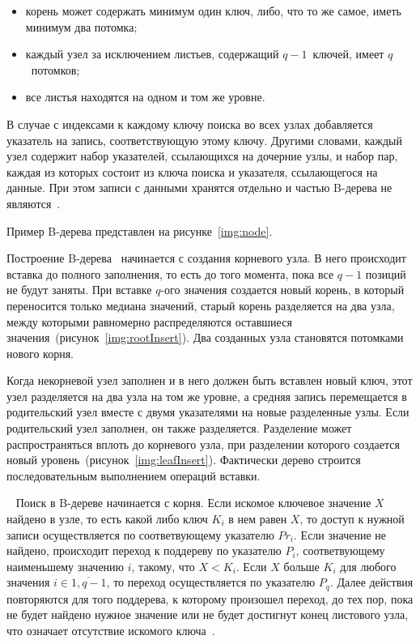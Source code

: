 \begin{itemize}
    \item корень может содержать минимум один ключ, либо, что то же самое, иметь
        минимум два потомка;

    \item каждый узел за исключением листьев, содержащий $q-1$~ключей, имеет
        $q$~потомков;

    \item все листья находятся на одном и том же уровне.
\end{itemize}

В случае с индексами к каждому ключу поиска во всех узлах добавляется указатель
на запись, соответствующую этому ключу. Другими словами, каждый узел содержит
набор указателей, ссылающихся на дочерние узлы, и набор пар, каждая из которых
состоит из ключа поиска и указателя, ссылающегося на данные. При этом записи с
данными хранятся отдельно и частью B-дерева не являются~\cite{arki}.

Пример B-дерева представлен на рисунке~\ref{img:node}.
~\\


Построение B-дерева~\cite{flatfish} начинается с создания корневого узла. В него
происходит вставка до полного заполнения, то есть до того момента, пока все
$q-1$ позиций не будут заняты. При вставке $q$-ого значения создается новый
корень, в который переносится только медиана значений, старый корень разделяется
на два узла, между которыми равномерно распределяются оставшиеся
значения~(рисунок~\ref{img:rootInsert}). Два созданных узла становятся потомками
нового корня.


Когда некорневой узел заполнен и в него должен быть вставлен новый ключ, этот
узел разделяется на два узла на том же уровне, а средняя запись перемещается в
родительский узел вместе с двумя указателями на новые разделенные узлы. Если
родительский узел заполнен, он также разделяется. Разделение может
распространяться вплоть до корневого узла, при разделении которого создается
новый уровень~(рисунок~\ref{img:leafInsert}). Фактически дерево строится
последовательным выполнением операций вставки.

 
Поиск в B-дереве начинается с корня. Если искомое ключевое значение $X$ найдено
в узле, то есть какой либо ключ $K_i$ в нем равен $X$, то доступ к нужной записи
осуществляется по соответвующему указателю $Pr_i$. Если значение не найдено,
происходит переход к поддереву по указателю $P_i$, соответвующему наименьшему
значению $i$, такому, что $X < K_i$. Если $X$ больше $K_i$ для любого значения
$i \in \overline{1, q - 1}$, то переход осуществляется по указателю $P_q$.
Далее действия повторяются для того поддерева, к которому произошел переход, до
тех пор, пока не будет найдено нужное значение или не будет достигнут конец
листового узла, что означает отсутствие искомого ключа~\cite{arki}.

